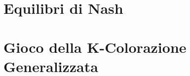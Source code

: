 \documentclass[11pt,a4paper,oneside,openany]{book}
\begin{document}
    
    \tableofcontents
    
    \part{Equilibri di Nash}    
    
    
    \part{Gioco della K-Colorazione Generalizzata}
    
    
	
	\printbibliography
	
\end{document}
